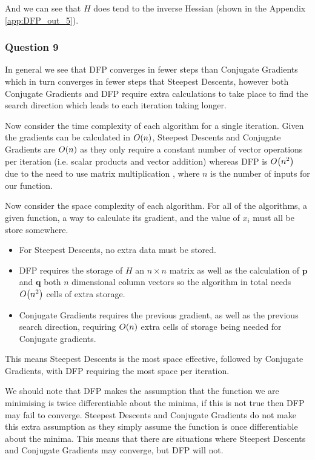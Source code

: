 \documentclass[11pt]{article} %
\let\originalleft\left
\let\originalright\right
\renewcommand{\left}{\mathopen{}\mathclose\bgroup\originalleft}
\renewcommand{\right}{\aftergroup\egroup\originalright}
\begin{document}
And we can see that $H$ does tend to the inverse Hessian (shown in the Appendix \ref{app:DFP_out_5}).

\subsubsection*{Question 9}

In general we see that DFP converges in fewer steps than Conjugate Gradients which in turn converges in fewer steps that Steepest Descents, however both Conjugate Gradients and DFP require extra calculations to take place to find the search direction which leads to each iteration taking longer. 

Now consider the time complexity of each algorithm for a single iteration. Given the gradients can be calculated in $O\left(n\right)$, Steepest Descents and Conjugate Gradients are $O\left(n\right)$ as they only require a constant number of vector operations per iteration (i.e. scalar products and vector addition) whereas DFP is $O\left(n^2\right)$ due to the need to use matrix multiplication , where $n$ is the number of inputs for our function. 

Now consider the space complexity of each algorithm. For all of the algorithms, a given function, a way to calculate its gradient, and the value of $x_i$ must all be store somewhere. 
\begin{itemize}
	\item For Steepest Descents, no extra data must be stored. 
	\item DFP requires the storage of $H$ an $n\times n$ matrix as well as the calculation of $\mathbf{p}$ and $\mathbf{q}$ both $n$ dimensional column vectors so the algorithm in total needs $O\left(n^2\right)$ cells of extra storage. 
	\item Conjugate Gradients requires the previous gradient, as well as the previous search direction, requiring $O\left(n\right)$ extra cells of storage being needed for Conjugate gradients.
\end{itemize}
This means Steepest Descents is the most space effective, followed by Conjugate Gradients, with DFP requiring the most space per iteration.

We should note that DFP makes the assumption that the function we are minimising is twice differentiable about the minima, if this is not true then DFP may fail to converge. Steepest Descents and Conjugate Gradients do not make this extra assumption as they simply assume the function is once differentiable about the minima. This means that there are situations where Steepest Descents and Conjugate Gradients may converge, but DFP will not.
\end{document}

